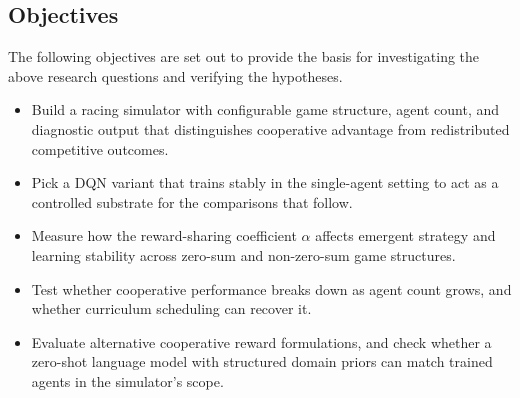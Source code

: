\subsection{Objectives}
The following objectives are set out to provide the basis for investigating the above research questions and verifying the hypotheses.

\begin{itemize}
    \item Build a racing simulator with configurable game structure, agent count, and diagnostic output that distinguishes cooperative advantage from redistributed competitive outcomes.
    \item Pick a DQN variant that trains stably in the single-agent setting to act as a controlled substrate for the comparisons that follow.
    \item Measure how the reward-sharing coefficient $\alpha$ affects emergent strategy and learning stability across zero-sum and non-zero-sum game structures.
    \item Test whether cooperative performance breaks down as agent count grows, and whether curriculum scheduling can recover it.
    \item Evaluate alternative cooperative reward formulations, and check whether a zero-shot language model with structured domain priors can match trained agents in the simulator's scope.
\end{itemize}